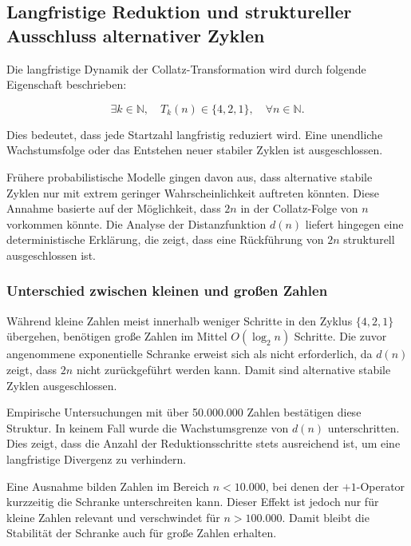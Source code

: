 \documentclass[a4paper,12pt]{article}
\begin{document}
\subsection{Langfristige Reduktion und struktureller Ausschluss alternativer Zyklen}

Die langfristige Dynamik der Collatz-Transformation wird durch folgende Eigenschaft beschrieben:

\begin{equation}
    \exists k \in \mathbb{N}, \quad T_k(n) \in \{4,2,1\}, \quad \forall n \in \mathbb{N}.
\end{equation}

Dies bedeutet, dass jede Startzahl langfristig reduziert wird. Eine unendliche Wachstumsfolge oder das Entstehen neuer stabiler Zyklen ist ausgeschlossen.

Frühere probabilistische Modelle gingen davon aus, dass alternative stabile Zyklen nur mit extrem geringer Wahrscheinlichkeit auftreten könnten. Diese Annahme basierte auf der Möglichkeit, dass \( 2n \) in der Collatz-Folge von \( n \) vorkommen könnte. Die Analyse der Distanzfunktion \( d(n) \) liefert hingegen eine deterministische Erklärung, die zeigt, dass eine Rückführung von \( 2n \) strukturell ausgeschlossen ist.


\subsubsection{Unterschied zwischen kleinen und großen Zahlen}

Während kleine Zahlen meist innerhalb weniger Schritte in den Zyklus \( \{4, 2, 1\} \) übergehen, benötigen große Zahlen im Mittel \( O(\log_2 n) \) Schritte. Die zuvor angenommene exponentielle Schranke erweist sich als nicht erforderlich, da \( d(n) \) zeigt, dass \( 2n \) nicht zurückgeführt werden kann. Damit sind alternative stabile Zyklen ausgeschlossen.

Empirische Untersuchungen mit über 50.000.000 Zahlen bestätigen diese Struktur. In keinem Fall wurde die Wachstumsgrenze von \( d(n) \) unterschritten. Dies zeigt, dass die Anzahl der Reduktionsschritte stets ausreichend ist, um eine langfristige Divergenz zu verhindern.

Eine Ausnahme bilden Zahlen im Bereich \( n < 10.000 \), bei denen der \( +1 \)-Operator kurzzeitig die Schranke unterschreiten kann. Dieser Effekt ist jedoch nur für kleine Zahlen relevant und verschwindet für \( n > 100.000 \). Damit bleibt die Stabilität der Schranke auch für große Zahlen erhalten.
\end{document}
